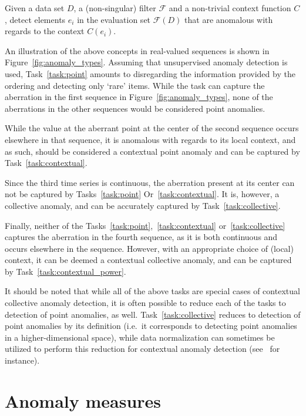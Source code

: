 \begin{task}
\label{task:contextual_power}
  Given a data set $D$, a (non-singular) filter $\mathcal{F}$ and a non-trivial context function $C$, detect elements $e_i$ in the evaluation set $\mathcal{F}(D)$ that are anomalous with regards to the context $C(e_i)$.
\end{task}

An illustration of the above concepts in real-valued sequences is shown in Figure~\ref{fig:anomaly_types}. Assuming that unsupervised anomaly detection is used, Task~\ref{task:point} amounts to disregarding the information provided by the ordering and detecting only `rare' items. While the task can capture the aberration in the first sequence in Figure~\ref{fig:anomaly_types}, none of the aberrations in the other sequences would be considered point anomalies.

While the value at the aberrant point at the center of the second sequence occurs elsewhere in that sequence, it is anomalous with regards to its local context, and as such, should be considered a contextual point anomaly and can be captured by Task~\ref{task:contextual}.

Since the third time series is continuous, the aberration present at its center can not be captured by Tasks~\ref{task:point} Or~\ref{task:contextual}. It is, however, a collective anomaly, and can be accurately captured by Task~\ref{task:collective}.

Finally, neither of the Tasks~\ref{task:point},~\ref{task:contextual} or~\ref{task:collective} captures the aberration in the fourth sequence, as it is both continuous and occurs elsewhere in the sequence. However, with an appropriate choice of (local) context, it can be deemed a contextual collective anomaly, and can be captured by Task~\ref{task:contextual_power}.

It should be noted that while all of the above tasks are special cases of contextual collective anomaly detection, it is often possible to reduce each of the tasks to detection of point anomalies, as well. Task~\ref{task:collective} reduces to detection of point anomalies by its definition (i.e.\ it corresponds to detecting point anomalies in a higher-dimensional space), while data normalization can sometimes be utilized to perform this reduction for contextual anomaly detection (see~\cite{meckesheimer} for instance).

\section{Anomaly measures}
\label{sect:anomaly_measures}

